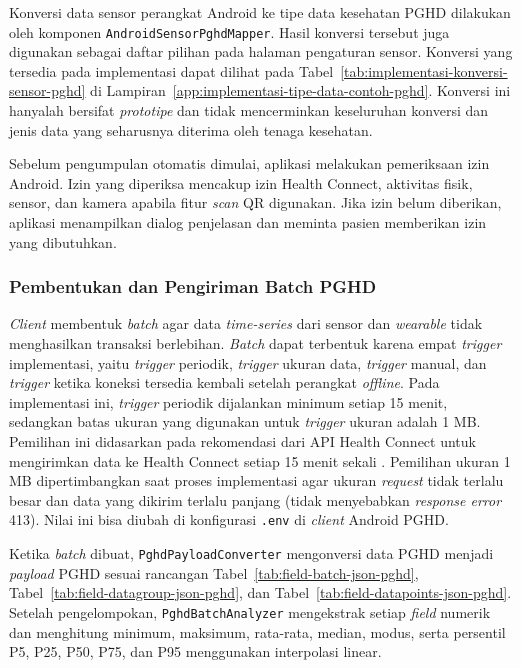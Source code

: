 Konversi data sensor perangkat Android ke tipe data kesehatan PGHD dilakukan oleh komponen \texttt{AndroidSensorPghdMapper}. Hasil konversi tersebut juga digunakan sebagai daftar pilihan pada halaman pengaturan sensor. 
Konversi yang tersedia pada implementasi dapat dilihat pada Tabel~\ref{tab:implementasi-konversi-sensor-pghd} di Lampiran~\ref{app:implementasi-tipe-data-contoh-pghd}.
Konversi ini hanyalah bersifat \textit{prototipe} dan tidak mencerminkan keseluruhan konversi dan jenis data yang seharusnya diterima oleh tenaga kesehatan.

Sebelum pengumpulan otomatis dimulai, aplikasi melakukan pemeriksaan izin Android. 
Izin yang diperiksa mencakup izin Health Connect, aktivitas fisik, sensor, dan kamera apabila fitur \textit{scan} QR digunakan. 
Jika izin belum diberikan, aplikasi menampilkan dialog penjelasan dan meminta pasien memberikan izin yang dibutuhkan.

\subsubsection{Pembentukan dan Pengiriman Batch PGHD}

\textit{Client} membentuk \textit{batch} agar data \textit{time-series} dari sensor dan \textit{wearable} tidak menghasilkan transaksi berlebihan. 
\textit{Batch} dapat terbentuk karena empat \textit{trigger} implementasi, yaitu \textit{trigger} periodik, \textit{trigger} ukuran data, \textit{trigger} manual, dan \textit{trigger} ketika koneksi tersedia kembali setelah perangkat \textit{offline}. 
Pada implementasi ini, \textit{trigger} periodik dijalankan minimum setiap 15 menit, sedangkan batas ukuran yang digunakan untuk \textit{trigger} ukuran adalah 1 MB\@.
Pemilihan ini didasarkan pada rekomendasi dari API Health Connect untuk mengirimkan data ke Health Connect setiap 15 menit sekali \parencite{android_hc_write}.
Pemilihan ukuran 1 MB dipertimbangkan saat proses implementasi agar ukuran \textit{request} tidak terlalu besar dan data yang dikirim terlalu panjang (tidak menyebabkan \textit{response error} 413).
Nilai ini bisa diubah di konfigurasi \texttt{.env} di \textit{client} Android PGHD\@.

Ketika \textit{batch} dibuat, \texttt{PghdPayloadConverter} mengonversi data PGHD menjadi \textit{payload} PGHD sesuai rancangan Tabel~\ref{tab:field-batch-json-pghd}, Tabel~\ref{tab:field-datagroup-json-pghd}, dan Tabel~\ref{tab:field-datapoints-json-pghd}. 
Setelah pengelompokan, \texttt{PghdBatchAnalyzer} mengekstrak setiap \textit{field} numerik dan menghitung minimum, maksimum, rata-rata, median, modus, serta persentil P5, P25, P50, P75, dan P95 menggunakan interpolasi linear. 

